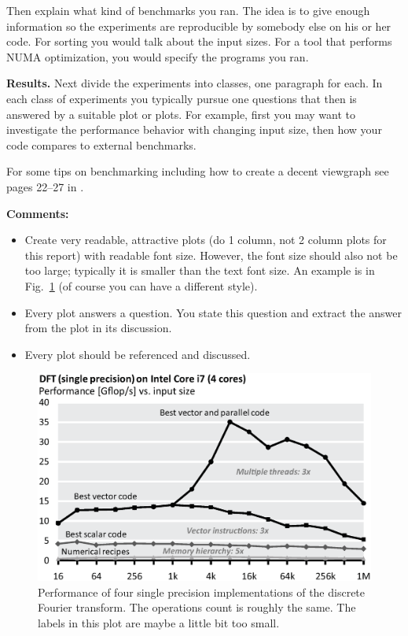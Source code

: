 \documentclass[letterpaper]{article}
\newcommand{\mypar}[1]{{\bf #1.}}
\begin{document}
Then explain what kind of benchmarks you ran. The idea is to give enough information so the experiments are reproducible by somebody else on his or her code.
For sorting you would talk about the input sizes. For a tool that performs NUMA optimization, you would specify the programs you ran.

\mypar{Results}
Next divide the experiments into classes, one paragraph for each. In each class of experiments you typically pursue one questions that then is answered by a suitable plot or plots. For example, first you may want to investigate the performance behavior with changing input size, then how your code compares to external benchmarks.

For some tips on benchmarking including how to create a decent viewgraph see pages 22--27 in \cite{Pueschel:10}.

{\bf Comments:}
\begin{itemize}
\item Create very readable, attractive plots (do 1 column, not 2 column plots
for this report) with readable font size. However, the font size should also not be too large; typically it is smaller than the text font size.
An example is in Fig.~\ref{fftperf} (of course you can have a different style).
\item Every plot answers a question. You state this question and extract the
answer from the plot in its discussion.
\item Every plot should be referenced and discussed.
\end{itemize}

\begin{figure}\centering
  \includegraphics[scale=0.33]{dft-performance.eps}
  \caption{Performance of four single precision implementations of the
  discrete Fourier transform. The operations count is roughly the
  same. The labels in this plot are maybe a little bit too small.\label{fftperf}}
\end{figure}
\end{document}

